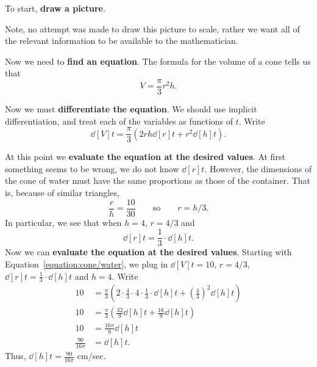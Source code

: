 \documentclass{ximera}
\begin{document}
\begin{solution}
To start, \textbf{draw a picture}.


Note, no attempt was made to draw this picture to scale, rather we
want all of the relevant information to be available to the
mathematician.

Now we need to \textbf{find an equation}. The formula for the volume of a cone tells us that 
\[
V = \frac{\pi}{3} r^2 h.
\]

Now we must \textbf{differentiate the equation}. We should use implicit differentiation, and treat each of the variables as functions of $t$. Write
\begin{equation}\label{equation:cone/water}
\dd[V]{t} = \frac{\pi}{3}\left(2rh \dd[r]{t} + r^2 \dd[h]{t}\right).
\end{equation}

At this point we \textbf{evaluate the equation at the desired values}.
At first something seems to be wrong, we do not know $\dd[r]{t}$.
However, the dimensions of the cone of water must have the same
proportions as those of the container.  That is, because of similar
triangles, 
\[
\frac{r}{h}=\frac{10}{30} \qquad\text{so}\qquad r={h/3}.
\]  
In particular, we see that when $h = 4$, $r=4/3$ and 
\[
\dd[r]{t} = \frac{1}{3}\cdot \dd[h]{t}.
\]
Now we can \textbf{evaluate the equation at the desired
  values}. Starting with Equation~\ref{equation:cone/water}, we plug
in $\dd[V]{t} = 10$, $r = 4/3$, $\dd[r]{t} = \frac{1}{3}\cdot \dd[h]{t}$
and $h=4$. Write
\begin{align*}
10 &= \frac{\pi}{3}\left(2\cdot \frac{4}{3}\cdot 4 \cdot\frac{1}{3}\cdot\dd[h]{t} + \left(\frac{4}{3}\right)^2 \dd[h]{t}\right)\\
10 &= \frac{\pi}{3}\left(\frac{32}{9}\dd[h]{t} + \frac{16}{9} \dd[h]{t}\right)\\
10 &= \frac{16\pi}{9}\dd[h]{t}\\
\frac{90}{16\pi} &= \dd[h]{t}.
\end{align*}
Thus, $\dd[h]{t}=\frac{90}{16\pi}$ cm/sec.
\end{solution}
\end{document}
